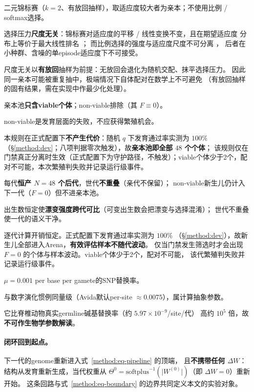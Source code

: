 \begin{description}
  \item 二元锦标赛（$k=2$、有放回抽样），取适应度较大者为亲本；不使用比例 / softmax选择。
  \item 选择压力\textbf{尺度无关}：锦标赛对适应度的平移 / 线性变换不变，且在期望适应度
        分布上等价于最大线性排名 \citep{bib136_blickle1996,bib137_eiben2015}；
        而比例选择的强度与适应度尺度不可分离 \citep{bib135_goldberg1991}，
        后者在小种群、含噪的单episode适应度下不可接受。
  \item[代价] 尺度无关以\textbf{有放回}抽样为前提：无放回会退化为随机交配、抹平选择压力。
        因此同一亲本可能被重复抽中，极端情况下自体配对在数学上不可避免
        （有放回抽样的固有结果，需在实现中作最少化处理）。
\end{description}

\begin{description}
  \item 亲本池\textbf{只含viable个体}；non-viable排除（其 $F\equiv0$）。
  \item non-viable是发育层面的失败，不应获得繁殖机会。
  \item[代价] 本规则在正式配置下\textbf{不产生代价}：随机 $q$ 下发育通过率实测为 $100\%$
        （\S\ref{method:dev}；八项判据零次触发），故\textbf{亲本池即全部 $48$ 个个体}；
        该规则仅在门禁真正分离时生效（正式配置下为守护路径，不触发）；viable个体少于2个，配对不可能，本次繁殖判失败并记录运行级事件。
\end{description}

\begin{description}
  \item 每代\textbf{恒产 $N=48$ 个后代}，世代\textbf{不重叠}（亲代不保留）；
        non-viable新生儿仍计入下一代（$F=0$）但不进亲本池。
  \item 出生数恒定使\textbf{漂变强度跨代可比}（可变出生数会把漂变与选择混淆）；
        世代不重叠使一代的语义干净。
  \item[代价] 逐代计算开销恒定。正式配置下发育通过率实测为 $100\%$
        （\S\ref{method:dev}），故新生儿全部进入Arena，\textbf{有效评估样本不随代波动}。
        仅当门禁发生筛选时才会出现 $F=0$ 的个体与样本波动。viable个体少于2个，配对不可能，
        该代繁殖判失败并记录运行级事件。
\end{description}

\begin{description}
  \item $\mu=0.001$ per base per gamete的SNP替换率。
  \item 与数字演化惯例同量级（Avida默认per-site $\approx0.0075$），属计算抽象参数。
  \item[代价] 它比脊椎动物真实germline碱基替换率（约 $5.97\times10^{-9}$/site/代）
        高约 $10^{5}$ 倍，故\textbf{不可作生物学参数解读}。
\end{description}

\paragraph{闭环回到起点。}下一代的genome重新进入式~\eqref{method:eq-pipeline} 的顶端，
且\textbf{不携带任何 $\Delta W$}：结构从发育重新生成，当代权重从
$\Theta^{0}=\mathrm{softplus}^{-1}(\lvert W^{(0)}\rvert)$（即 $\Delta W=0$）重新开始。
这条回路与式~\eqref{method:eq-boundary} 的边界共同定义本文的实验对象。

